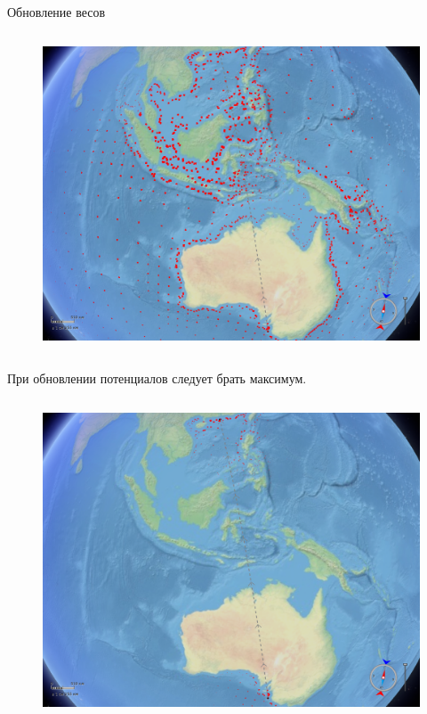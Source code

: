 \documentclass[russian, hyperref={unicode}]{beamer}
\begin{document}
\begin{frame}[noframenumbering]{Обновление весов}
{\begin{columns}
            \begin{figure}
                \includegraphics[clip=true, trim = 280pt 0 20pt 0, width=\textwidth]{Solution/potentials-update/max3}
            \end{figure}
        \end{columns}
        
        \begin{center}
            При обновлении потенциалов следует брать максимум.
        \end{center}
    }
   
     {
        \begin{columns}
            \begin{figure}
                \includegraphics[clip=true, trim = 280pt 0 20pt 0, width=\textwidth]{Solution/potentials-update/accum4}
            \end{figure}


\end{columns}}
\end{frame}
\end{document}
